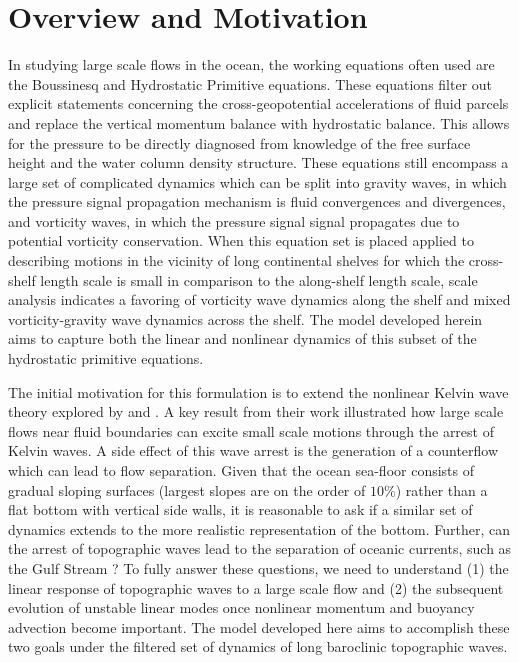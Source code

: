 \documentclass[12pt]{memoir}
\begin{document}
\chapter{Overview and Motivation}
In studying large scale flows in the ocean, the working equations often used are the Boussinesq and Hydrostatic Primitive equations. These equations filter out explicit statements concerning the cross-geopotential accelerations of fluid parcels and replace the vertical momentum balance with hydrostatic balance. This allows for the pressure to be directly diagnosed from knowledge of the free surface height and the water column density structure. These equations still encompass a large set of complicated dynamics which can be split into gravity waves, in which the pressure signal propagation mechanism is fluid convergences and divergences, and vorticity waves, in which the pressure signal signal propagates due to potential vorticity conservation. When this equation set is placed applied to describing motions in the vicinity of long continental shelves for which the cross-shelf length scale is small in comparison to the along-shelf length scale, scale analysis indicates a favoring of vorticity wave dynamics along the shelf and mixed vorticity-gravity wave dynamics across the shelf. The model developed herein aims to capture both the linear and nonlinear dynamics of this subset of the hydrostatic primitive equations. 


The initial motivation for this formulation is to extend the nonlinear Kelvin wave theory explored by \citet{Dewar_Hogg2010} and \citet{HoggEtAl2011}. A key result from their work illustrated how large scale flows near fluid boundaries can excite small scale motions through the arrest of Kelvin waves. A side effect of this wave arrest is the generation of a counterflow which can lead to flow separation. Given that the ocean sea-floor consists of gradual sloping surfaces (largest slopes are on the order of $10\%$) rather than a flat bottom with vertical side walls, it is reasonable to ask if a similar set of dynamics extends to the more realistic representation of the bottom. Further, can the arrest of topographic waves lead to the separation of oceanic currents, such as the Gulf Stream ? To fully answer these questions, we need to understand (1) the linear response of topographic waves to a large scale flow and (2) the subsequent evolution of unstable linear modes once nonlinear momentum and buoyancy advection become important. The model developed here aims to accomplish these two goals under the filtered set of dynamics of long baroclinic topographic waves.
\end{document}
